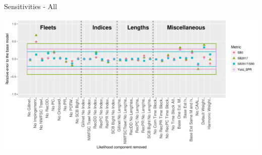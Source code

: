 \documentclass[ignorenonframetext,]{beamer}
\begin{document}
\begin{frame}{Sensitivities - All}

\includegraphics{Figures/Sensitivity_All.pdf}

\end{frame}
\end{document}
